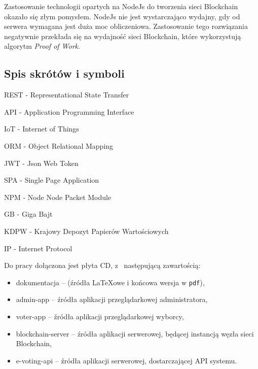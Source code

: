 \documentclass[a4paper,12pt]{book}
\begin{document}
Zastosowanie technologii opartych na NodeJs do tworzenia sieci Blockchain okazało się złym pomysłem. NodeJs nie jest wystarczająco wydajny, gdy od serwera wymagana jest duża moc obliczeniowa. Zastosowanie tego rozwiązania negatywnie przekłada się na wydajność sieci Blockchain, które wykorzystują algorytm \textit{Proof of Work}.

 


\begin{appendices}
 
  \chapter*{Spis skrótów i symboli}
  
  \begin{description}
    \item REST - Representational State Transfer
    \item API - Application Programming Interface
    \item IoT - Internet of Things
    \item ORM - Object Relational Mapping
    \item JWT - Json Web Token
    \item SPA - Single Page Application
    \item NPM - Node Node Packet Module
    \item GB - Giga Bajt
    \item KDPW - Krajowy Depozyt Papierów Wartościowych
    \item IP - Internet Protocol
  \end{description}

\newpage

Do pracy dołączona jest płyta CD, z~ następującą zawartością:

\begin{itemize}
  \item dokumentacja -- (źródła \LaTeX owe i końcowa wersja w \texttt{pdf}),
  \item admin-app -- źródła aplikacji przeglądarkowej administratora,
  \item voter-app -- źródła aplikacji przeglądarkowej wyborcy,
  \item blockchain-server -- źródła aplikacji serwerowej, będącej instancją węzła sieci Blockchain,
  \item e-voting-api -- źródła aplikacji serwerowej, dostarczającej API systemu.
\end{itemize}

\listoffigures

\end{appendices}
\end{document}
